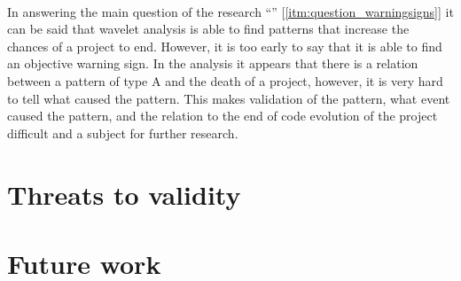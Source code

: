 \paragraph{}
In answering the main question of the research
``\emph{\researchQuestion}\rm'' [\ref{itm:question_warningsigns}]
it can be said that wavelet analysis is able to find patterns that increase the
chances of a project to end. However, it is too early to say that it is able to
find an objective warning sign. In the analysis it appears that there is a
relation between a pattern of type A and the death of a project, however, it is
very hard to tell what caused the pattern.
This makes validation of the pattern, what event caused the pattern, and the
relation to the end of code evolution of the project difficult and a subject
for further research.


\section{Threats to validity}
\begin{comment}
* Is the Ohloh database a representation of the world of OSS projects?
* Is LOC as the sum of source lines of code, comments, and blank lines valid?
* The use of LOC as a measure of project evolution. Does it represent
activity/growth/whatever to say something about the project's status?
* A selection criterion for the projects was a continuous series of subsequent
monthly facts. Maybe the full series of evolution data of a project is needed in
order to find objective signs or to be able to compare different projects.
* Is 250 projects enough to detect patterns and generalise to the world of OSS
projects?
* Is monthly aggregated data fine-grained enough?

\end{comment}

\section{Future work}


